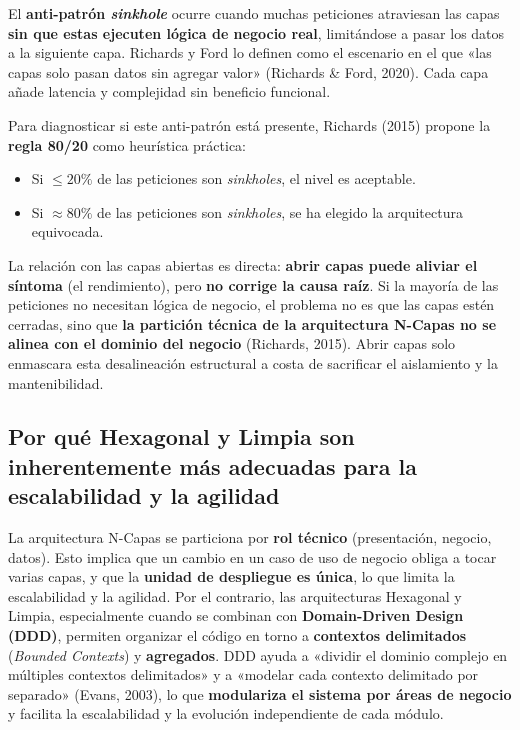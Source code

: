 \documentclass[11pt,a4paper]{article}
\begin{document}
El \textbf{anti-patrón \emph{sinkhole}} ocurre cuando muchas peticiones atraviesan las capas
\textbf{sin que estas ejecuten lógica de negocio real}, limitándose a pasar los datos a la
siguiente capa. Richards y Ford lo definen como el escenario en el que «las capas solo pasan
datos sin agregar valor» (Richards \& Ford, 2020). Cada capa añade latencia y complejidad sin
beneficio funcional.

Para diagnosticar si este anti-patrón está presente, Richards (2015) propone la
\textbf{regla 80/20} como heurística práctica:

\begin{itemize}[leftmargin=1.4em]
\item Si \(\leq 20\%\) de las peticiones son \emph{sinkholes}, el nivel es aceptable.
\item Si \(\approx 80\%\) de las peticiones son \emph{sinkholes}, se ha elegido la arquitectura
equivocada.
\end{itemize}

La relación con las capas abiertas es directa: \textbf{abrir capas puede aliviar el síntoma}
(el rendimiento), pero \textbf{no corrige la causa raíz}. Si la mayoría de las peticiones no
necesitan lógica de negocio, el problema no es que las capas estén cerradas, sino que
\textbf{la partición técnica de la arquitectura N-Capas no se alinea con el dominio del
negocio} (Richards, 2015). Abrir capas solo enmascara esta desalineación estructural a costa
de sacrificar el aislamiento y la mantenibilidad.

\subsection*{Por qué Hexagonal y Limpia son inherentemente más adecuadas para la escalabilidad y la agilidad}

La arquitectura N-Capas se particiona por \textbf{rol técnico} (presentación, negocio, datos).
Esto implica que un cambio en un caso de uso de negocio obliga a tocar varias capas, y que la
\textbf{unidad de despliegue es única}, lo que limita la escalabilidad y la agilidad. Por el
contrario, las arquitecturas Hexagonal y Limpia, especialmente cuando se combinan con
\textbf{Domain-Driven Design (DDD)}, permiten organizar el código en torno a \textbf{contextos
delimitados} (\emph{Bounded Contexts}) y \textbf{agregados}. DDD ayuda a «dividir el dominio
complejo en múltiples contextos delimitados» y a «modelar cada contexto delimitado por
separado» (Evans, 2003), lo que \textbf{modulariza el sistema por áreas de negocio} y facilita
la escalabilidad y la evolución independiente de cada módulo.
\end{document}
